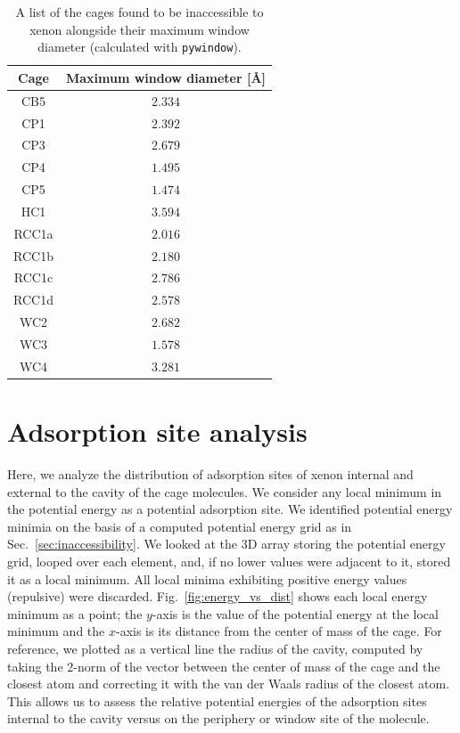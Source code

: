 \documentclass[journal=jacsat,manuscript=article]{achemso}
\begin{document}
{\begin{table}
  \caption{\color{red}A list of the cages found to be inaccessible to xenon alongside their maximum window diameter (calculated with \texttt{pywindow}).}
  \label{tbl:inaccessible}
  \begin{tabular}{cc}
    \hline
    \textbf{Cage}  & \textbf{Maximum window diameter [\AA]}  \\
    \hline
    CB5 & $2.334$ \\
    CP1 & $2.392$ \\
    CP3 & $2.679$ \\
    CP4 & $1.495$ \\
	CP5 & $1.474$ \\
    HC1 & $3.594$ \\
    RCC1a & $2.016$ \\
    RCC1b & $2.180$ \\
    RCC1c & $2.786$ \\
	RCC1d & $2.578$ \\
	WC2 & $2.682$ \\
	WC3 & $1.578$ \\
	WC4 & $3.281$ \\
    \hline
  \end{tabular}
\end{table}

\clearpage
\newpage


\section{\color{red}Adsorption site analysis}
Here, we analyze the distribution of adsorption sites of xenon internal and external to the cavity of the cage molecules. We consider any local minimum in the potential energy as a potential adsorption site. We identified potential energy minimia on the basis of a computed potential energy grid as in Sec.~\ref{sec:inaccessibility}. We looked at the 3D array storing the potential energy grid, looped over each element, and, if no lower values were adjacent to it, stored it as a local minimum. All local minima exhibiting positive energy values (repulsive) were discarded. 
Fig.~\ref{fig:energy_vs_dist} shows each local energy minimum as a point; the $y$-axis is the value of the potential energy at the local minimum and the $x$-axis is its distance from the center of mass of the cage. For reference, we plotted as a vertical line the radius of the cavity, computed by taking the 2-norm of the vector between the center of mass of the cage and the closest atom and correcting it with the van der Waals radius of the closest atom. This allows us to assess the relative potential energies of the adsorption sites internal to the cavity versus on the periphery or window site of the molecule.}
\end{document}
